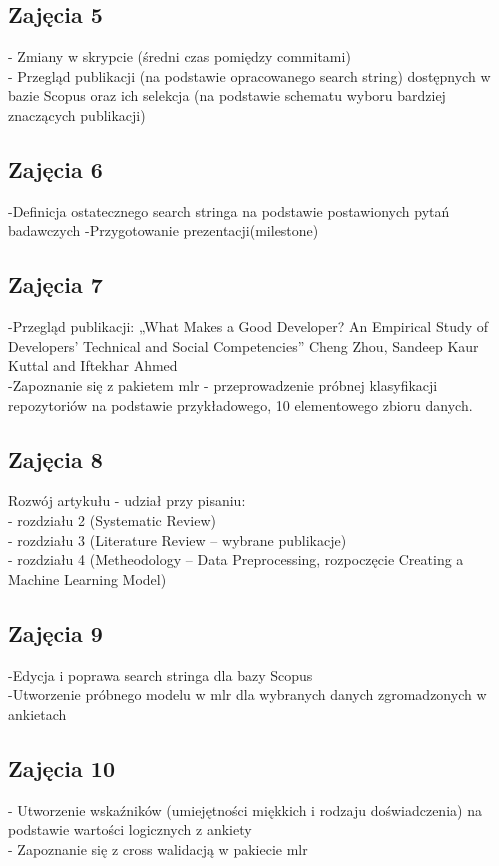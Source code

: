 \documentclass[graybox]{svmult}
\begin{document}
\subsection{Zajęcia 5}
- Zmiany w skrypcie (średni czas pomiędzy commitami)\\
- Przegląd publikacji (na podstawie opracowanego search string) dostępnych w bazie Scopus oraz ich selekcja (na podstawie schematu wyboru bardziej znaczących publikacji)

\subsection{Zajęcia 6}
-Definicja ostatecznego search stringa na podstawie postawionych pytań badawczych
-Przygotowanie prezentacji(milestone)

\subsection{Zajęcia 7}
-Przegląd publikacji: „What Makes a Good Developer? An Empirical Study of Developers' Technical and Social Competencies”  Cheng Zhou, Sandeep Kaur Kuttal and Iftekhar Ahmed\\
-Zapoznanie się z pakietem mlr - przeprowadzenie próbnej klasyfikacji repozytoriów na podstawie przykładowego, 10 elementowego zbioru danych.

\subsection{Zajęcia 8}
Rozwój artykułu - udział przy pisaniu:\\
- rozdziału 2 (Systematic Review)\\
- rozdziału 3 (Literature Review – wybrane publikacje)\\
- rozdziału 4 (Metheodology – Data Preprocessing, rozpoczęcie Creating a Machine Learning Model)

\subsection{Zajęcia 9}
-Edycja i poprawa search stringa dla bazy Scopus\\
-Utworzenie próbnego modelu w mlr dla wybranych danych zgromadzonych w ankietach\\

\subsection{Zajęcia 10}
- Utworzenie wskaźników (umiejętności miękkich i rodzaju doświadczenia) na podstawie wartości logicznych z ankiety\\
- Zapoznanie się z cross walidacją w pakiecie mlr\\
\end{document}
